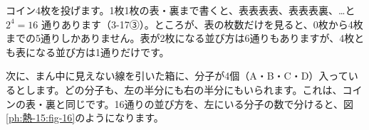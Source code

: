 

\label{ph:熱-15:sec1}
コイン4枚を投げます。1枚1枚の表・裏まで書くと、表表表表、表表表裏、…と $2^4=16$ 通りあります（3-17③）。ところが、表の枚数だけを見ると、0枚から4枚までの5通りしかありません。表が2枚になる並び方は6通りもありますが、4枚とも表になる並び方は1通りだけです。

次に、まん中に見えない線を引いた箱に、分子が4個（A・B・C・D）入っているとします。どの分子も、左の半分にも右の半分にもいられます。これは、コインの表・裏と同じです。16通りの並び方を、左にいる分子の数で分けると、図\ref{ph:熱-15:fig-16}のようになります。
